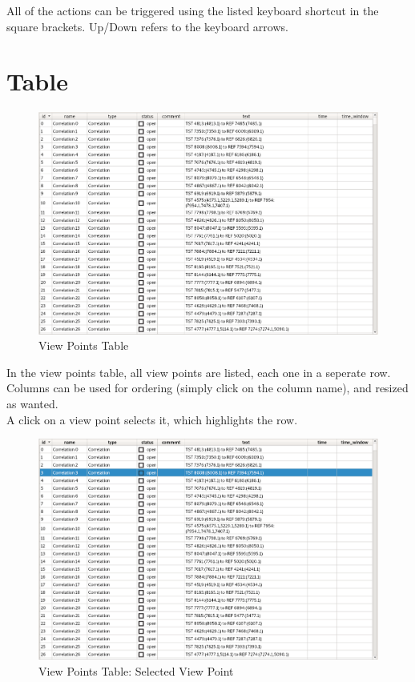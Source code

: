 All of the actions can be triggered using the listed keyboard shortcut in the square brackets. Up/Down refers to the keyboard arrows.

\section{Table}

\begin{figure}[H]
    \hspace*{-2cm}
    \includegraphics[width=18cm,frame]{figures/view_points_table.png}
  \caption{View Points Table}
\end{figure}

In the view points table, all view points are listed, each one in a seperate row. Columns can be used for ordering (simply click on the column name), and resized as wanted. \\

A click on a view point selects it, which highlights the row.

\begin{figure}[H]
    \hspace*{-2cm}
    \includegraphics[width=18cm,frame]{figures/view_points_table_selected.png}
  \caption{View Points Table: Selected View Point}
\end{figure}

